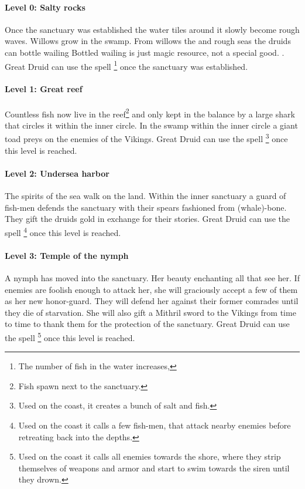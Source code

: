 \documentclass[a4paper]{book}
\begin{document}
			\paragraph{Level 0: Salty rocks}
				Once the sanctuary was established the water tiles around it slowly
				become rough waves.
				Willows grow in the swamp.
				From willows the and rough seas the druids can bottle wailing{
					Bottled wailing is just magic resource, not a special good.
				}.
				Great Druid can use the spell \footnote{
					The number of fish in the water increases,
				} once the sanctuary was established.

			\paragraph{Level 1: Great reef}
				Countless fish now live in the reef\footnote{
					Fish spawn next to the sanctuary.
				}
				and only kept in the balance by a large shark that circles it within the inner circle.
				In the swamp within the inner circle a giant toad preys on the enemies of the \gls{Vikings}.
				Great Druid can use the spell \footnote{
					Used on the coast, it creates a bunch of salt and fish.
				} once this level is reached.

			\paragraph{Level 2: Undersea harbor}
				The spirits of the sea walk on the land.
				Within the inner sanctuary a guard of fish-men defends the sanctuary
				with their spears fashioned from (whale)-bone.
				They gift the druids gold in exchange for their stories.
				Great Druid can use the spell \footnote{
					Used on the coast it calls a few fish-men,
					that attack nearby enemies before retreating back into the depths.
				} once this level is reached.

			\paragraph{Level 3: Temple of the nymph}
				A nymph has moved into the sanctuary.
				Her beauty enchanting all that see her.
				If enemies are foolish enough to attack her,
				she will graciously accept a few of them as her new honor-guard.
				They will defend her against their former comrades until they die of
				starvation.
				She will also gift a Mithril sword to the \gls{Vikings} from time to time
				to thank them for the protection of the sanctuary.
				Great Druid can use the spell \footnote{
					Used on the coast it calls all enemies towards the shore,
					where they strip themselves of weapons and armor
					and start to swim towards the siren until they drown.
				} once this level is reached.
\end{document}
